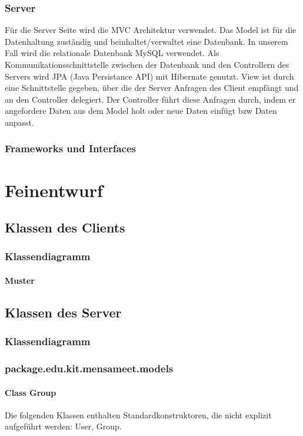 \documentclass[a4paper]{scrreprt}
\begin{document}
\subsection{Server}
Für die Server Seite wird die MVC Architektur verwendet.
Das Model ist für die Datenhaltung zuständig und beinhaltet/verwaltet eine Datenbank.  In unserem Fall wird die relationale Datenbank MySQL verwendet. Als Kommunikationsschnittstelle zwischen der Datenbank und den Controllern des Servers wird JPA (Java Persistance API) mit Hibernate genutzt.
View ist durch eine Schnittstelle gegeben, über die der Server Anfragen des Client empfängt und an den Controller delegiert. Der Controller führt diese Anfragen durch, indem er angefordere Daten aus dem Model holt oder neue Daten einfügt bzw Daten anpasst.

\subsection{Frameworks und Interfaces}


\chapter{Feinentwurf}
\section{Klassen des Clients}
\subsection{Klassendiagramm}

\subsubsection{Muster}

\section{Klassen des Server}
\subsection{Klassendiagramm}

\subsection{package.edu.kit.mensameet.models}
\subsubsection{Class Group}
Die folgenden Klassen enthalten Standardkonstruktoren, die nicht explizit aufgeführt werden: User, Group.
\end{document}
